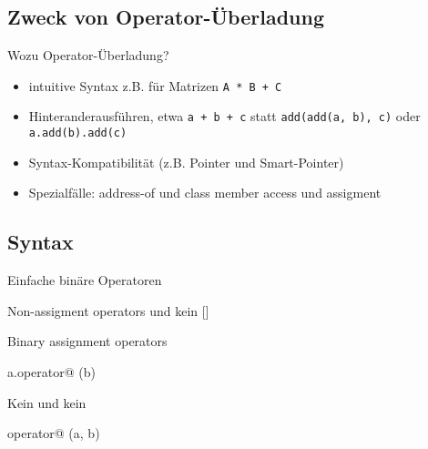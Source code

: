\subsection{Zweck von Operator-Überladung}

\begin{frame}[fragile]{Wozu Operator-Überladung?}
	\begin{itemize}[<+->]
		\item intuitive Syntax z.B. für Matrizen \verb|A * B + C|
		\item Hinteranderausführen, etwa \verb|a + b + c| statt \verb|add(add(a, b), c)| oder \verb|a.add(b).add(c)|
		\item Syntax-Kompatibilität (z.B. Pointer und Smart-Pointer)
		\item Spezialfälle: address-of \cppop{\&} und class member access \cppop{-\textgreater} und assigment \cppop{=}
	\end{itemize}
\end{frame}




\subsection{Syntax}

\begin{frame}[fragile, b]{Einfache binäre Operatoren}
	\onslide*<+>
	{
		\begin{block}{}
			
		\end{block}
	}
	
	\onslide*<+>
	{
		Non-assigment operators und kein []
		
		\begin{block}{}
			
		\end{block}
	}
	
	\vspace{3em}
\end{frame}


\begin{frame}[fragile, b]{Binary assignment operators}
	\onslide*<+>
	{
		\begin{block}{a.operator@ (b)}
			
		\end{block}
	}
	
	\onslide*<+>
	{
		Kein \cppop{[]} und kein \cppop{()}
		
		\begin{block}{operator@ (a, b)}
			
		\end{block}
	}
	
	\vspace{1em}
\end{frame}


